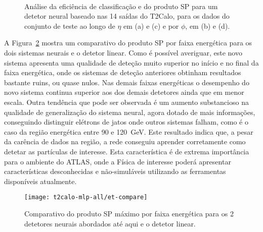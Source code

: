 \begin{figure}
\begin{center}
\mbox{%
}
\mbox{%
}
\end{center}
\caption{Análise da eficiência de classificação e do produto SP para um
detetor neural baseado nas 14 saídas do T2Calo, para os dados do conjunto de
teste ao longo de $\eta$ em (a) e (c) e por $\phi$, em (b) e (d).}
\label{fig:t2calo-mlp-eta-phi}
\end{figure}


A Figura~\ref{fig:t2calo-mlp-all-energy-comp} mostra um comparativo do produto
SP por faixa energética para os dois sistemas neurais e o detetor linear. Como
é possível averiguar, este novo sistema apresenta uma qualidade de deteção
muito superior no início e no final da faixa energética, onde os sistemas de
deteção anteriores obtinham resultados bastante ruins, ou quase nulos. Nas
demais faixas energéticas o desempenho do novo sistema continua superior aos
dos demais detetores ainda que em menor escala. Outra tendência que pode ser
observada é um aumento substancioso na qualidade de generalização do sistema
neural, agora dotado de mais informações, conseguindo distinguir elétrons de
jatos onde outros sistemas falham, como é o caso da região energética entre 90
e 120~GeV. Este resultado indica que, a pesar da carência de dados na região,
a rede conseguiu aprender corretamente como detetar as partículas de
interesse. Esta característica é de extrema importância para o ambiente do
ATLAS, onde a Física de interesse poderá apresentar características
desconhecidas e não-simuláveis utilizando as ferramentas disponíveis
atualmente.

\begin{figure}
\begin{center}
\texttt{[image: t2calo-mlp-all/et-compare]}
\end{center}
\caption{Comparativo do produto SP máximo por faixa energética para os 2
detetores neurais abordados até aqui e o detetor linear.}
\label{fig:t2calo-mlp-all-energy-comp}
\end{figure}

